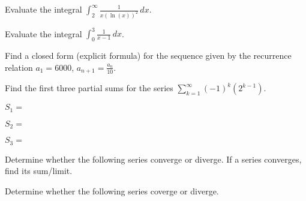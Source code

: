 \documentclass[addpoints,12pt]{exam}
\newcommand {\ds}{\displaystyle}
\begin{document}
\begin{questions}

\question[6] Evaluate the integral $\ds \int_2^{\infty} \frac{1}{x
    (\ln(x))^2} \, dx$.
  \vfill

\question[6] Evaluate the integral $\ds \int_0^3 \frac{1}{x-1} \, dx$.
  \vfill

\question[6] Find a closed form (explicit formula) for the sequence
  given by the recurrence relation $\ds a_1 = 6000$, $a_{n+1} =
  \frac{a_n}{10}$.
  \vfill

  \newpage

\question[4] Find the first three partial sums for the series $\ds
  \sum_{k=1}^{\infty} (-1)^k(2^{k-1})$.
  \vspace{0.2cm}
  
  $S_1 =$ \underline{\hspace{4cm}}
  \vspace{0.5cm}
  
  $S_2 =$ \underline{\hspace{4cm}}
  \vspace{0.5cm}
  
  $S_3 =$ \underline{\hspace{4cm}}
  \vspace{0.5cm}

\question Determine whether the following series converge or
  diverge. If a series converges, find its sum/limit.

  \newpage

\question Determine whether the following series coverge or diverge.
\end{questions}
\end{document}
